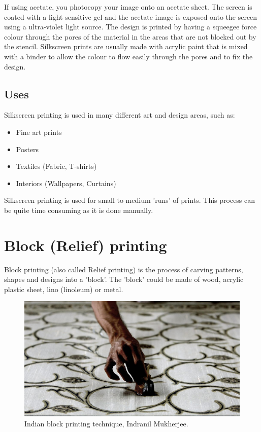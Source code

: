 \documentclass[a4paper,12pt]{article}
\begin{document}
If using acetate, you photocopy your image onto an acetate sheet. The screen is coated with a light-sensitive gel and the acetate image is exposed onto
the screen using a ultra-violet light source.
The design is printed by having a squeegee force colour through the pores of the material in the areas that are not blocked out by the stencil.
Silkscreen prints are usually made with acrylic paint that is mixed with a binder to allow the colour to flow easily through the pores and to fix the design.

\subsection*{Uses}
Silkscreen printing is used in many different art and design areas, such as:
\begin{itemize}
\item{Fine art prints}
\item{Posters}
\item{Textiles (Fabric, T-shirts)}
\item{Interiors (Wallpapers, Curtains)}
\end{itemize}
Silkscreen printing is used for small to medium 'runs' of prints. This process can be quite time consuming as it is done manually.


\section{Block (Relief) printing}


Block printing (also called Relief printing) is the process of carving patterns, shapes and designs into a 'block'. The 'block' could be made of wood, acrylic plastic sheet, lino (linoleum) or metal.

\begin{figure}[h!]
    \centering
    \includegraphics[scale=.7]{img/pic02.jpg}
    \caption{Indian block printing technique, Indranil Mukherjee.}
\end{figure}
\end{document}
